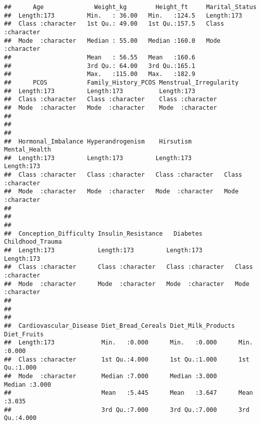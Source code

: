 \documentclass[
]{article}
\begin{document}
\begin{verbatim}
##      Age              Weight_kg        Height_ft     Marital_Status    
##  Length:173         Min.   : 36.00   Min.   :124.5   Length:173        
##  Class :character   1st Qu.: 49.00   1st Qu.:157.5   Class :character  
##  Mode  :character   Median : 55.00   Median :160.0   Mode  :character  
##                     Mean   : 56.55   Mean   :160.6                     
##                     3rd Qu.: 64.00   3rd Qu.:165.1                     
##                     Max.   :115.00   Max.   :182.9                     
##      PCOS           Family_History_PCOS Menstrual_Irregularity
##  Length:173         Length:173          Length:173            
##  Class :character   Class :character    Class :character      
##  Mode  :character   Mode  :character    Mode  :character      
##                                                               
##                                                               
##                                                               
##  Hormonal_Imbalance Hyperandrogenism    Hirsutism         Mental_Health     
##  Length:173         Length:173         Length:173         Length:173        
##  Class :character   Class :character   Class :character   Class :character  
##  Mode  :character   Mode  :character   Mode  :character   Mode  :character  
##                                                                             
##                                                                             
##                                                                             
##  Conception_Difficulty Insulin_Resistance   Diabetes         Childhood_Trauma  
##  Length:173            Length:173         Length:173         Length:173        
##  Class :character      Class :character   Class :character   Class :character  
##  Mode  :character      Mode  :character   Mode  :character   Mode  :character  
##                                                                                
##                                                                                
##                                                                                
##  Cardiovascular_Disease Diet_Bread_Cereals Diet_Milk_Products  Diet_Fruits   
##  Length:173             Min.   :0.000      Min.   :0.000      Min.   :0.000  
##  Class :character       1st Qu.:4.000      1st Qu.:1.000      1st Qu.:1.000  
##  Mode  :character       Median :7.000      Median :3.000      Median :3.000  
##                         Mean   :5.445      Mean   :3.647      Mean   :3.035  
##                         3rd Qu.:7.000      3rd Qu.:7.000      3rd Qu.:4.000  

\end{verbatim}
\end{document}
